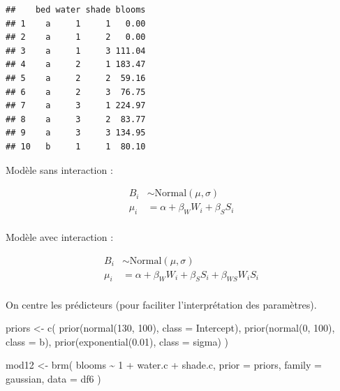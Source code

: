 \documentclass[
  a4paper,11pt,twoside,onecolumn,openright,final,oldfontcommands]{memoir}
\newenvironment{Shaded}{\begin{snugshade}}{\end{snugshade}}
\newcommand{\AttributeTok}[1]{\textcolor[rgb]{0.77,0.63,0.00}{#1}}
\newcommand{\DecValTok}[1]{\textcolor[rgb]{0.00,0.00,0.81}{#1}}
\newcommand{\FloatTok}[1]{\textcolor[rgb]{0.00,0.00,0.81}{#1}}
\newcommand{\FunctionTok}[1]{\textcolor[rgb]{0.00,0.00,0.00}{#1}}
\newcommand{\NormalTok}[1]{#1}
\newcommand{\OtherTok}[1]{\textcolor[rgb]{0.56,0.35,0.01}{#1}}
\newcommand{\SpecialCharTok}[1]{\textcolor[rgb]{0.00,0.00,0.00}{#1}}
\theoremstyle{definition}
\theoremstyle{definition}
\theoremstyle{definition}
\theoremstyle{remark}
\begin{document}
\begin{verbatim}
##    bed water shade blooms
## 1    a     1     1   0.00
## 2    a     1     2   0.00
## 3    a     1     3 111.04
## 4    a     2     1 183.47
## 5    a     2     2  59.16
## 6    a     2     3  76.75
## 7    a     3     1 224.97
## 8    a     3     2  83.77
## 9    a     3     3 134.95
## 10   b     1     1  80.10
\end{verbatim}

Modèle sans interaction :

\[
\begin{aligned}
B_{i} &\sim \mathrm{Normal}(\mu, \sigma) \\
\mu_{i} &= \alpha + \beta_{W} W_{i} + \beta_{S} S_{i} \\
\end{aligned}
\]

Modèle avec interaction :

\[
\begin{aligned}
B_{i} &\sim \mathrm{Normal}(\mu, \sigma) \\
\mu_{i} &= \alpha + \beta_{W} W_{i} + \beta_{S} S_{i} + \beta_{WS} W_{i} S_{i}\\
\end{aligned}
\]

On centre les prédicteurs (pour faciliter l'interprétation des paramètres).

\begin{Shaded}
\end{Shaded}

\begin{Shaded}
\begin{Highlighting}[]
\NormalTok{priors }\OtherTok{\textless{}{-}} \FunctionTok{c}\NormalTok{(}
  \FunctionTok{prior}\NormalTok{(}\FunctionTok{normal}\NormalTok{(}\DecValTok{130}\NormalTok{, }\DecValTok{100}\NormalTok{), }\AttributeTok{class =}\NormalTok{ Intercept),}
  \FunctionTok{prior}\NormalTok{(}\FunctionTok{normal}\NormalTok{(}\DecValTok{0}\NormalTok{, }\DecValTok{100}\NormalTok{), }\AttributeTok{class =}\NormalTok{ b),}
  \FunctionTok{prior}\NormalTok{(}\FunctionTok{exponential}\NormalTok{(}\FloatTok{0.01}\NormalTok{), }\AttributeTok{class =}\NormalTok{ sigma)}
\NormalTok{  )}

\NormalTok{mod12 }\OtherTok{\textless{}{-}} \FunctionTok{brm}\NormalTok{(}
\NormalTok{  blooms }\SpecialCharTok{\textasciitilde{}} \DecValTok{1} \SpecialCharTok{+}\NormalTok{ water.c }\SpecialCharTok{+}\NormalTok{ shade.c,}
  \AttributeTok{prior =}\NormalTok{ priors,}
  \AttributeTok{family =}\NormalTok{ gaussian,}
  \AttributeTok{data =}\NormalTok{ df6}
\NormalTok{  )}
\end{Highlighting}
\end{Shaded}
\end{document}
